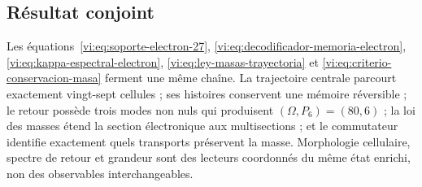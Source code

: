 \subsection{Résultat conjoint
}

Les équations~\eqref{vi:eq:soporte-electron-27},
\eqref{vi:eq:decodificador-memoria-electron},
\eqref{vi:eq:kappa-espectral-electron},
\eqref{vi:eq:ley-masas-trayectoria} et
\eqref{vi:eq:criterio-conservacion-masa} ferment une même chaîne. La
trajectoire centrale parcourt exactement vingt-sept cellules ; ses histoires
conservent une mémoire réversible ; le retour possède trois modes non nuls qui
produisent $(\Omega,P_6)=(80,6)$ ; la loi des masses étend la section
électronique aux multisections ; et le commutateur identifie exactement
quels transports préservent la masse. Morphologie cellulaire, spectre de retour et
grandeur sont des lecteurs coordonnés du même état enrichi, non des
observables interchangeables.

